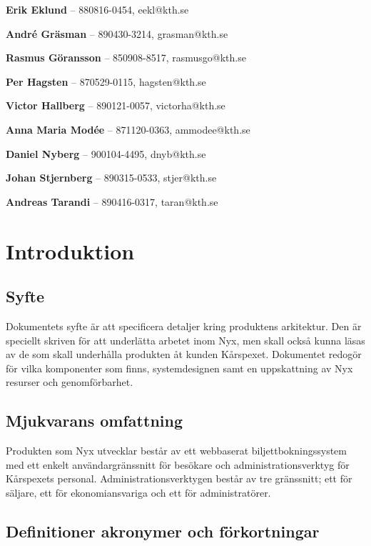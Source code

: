 \documentclass[a4paper, twoside, 11pt, titlepage]{article}
\begin{document}
\textbf{Erik Eklund} -- 880816-0454, eekl@kth.se 

\textbf{André Gräsman} -- 890430-3214, grasman@kth.se 

\textbf{Rasmus Göransson} -- 850908-8517, rasmusgo@kth.se 

\textbf{Per Hagsten} -- 870529-0115, hagsten@kth.se

\textbf{Victor Hallberg} -- 890121-0057, victorha@kth.se

\textbf{Anna Maria Modée} -- 871120-0363, ammodee@kth.se 

\textbf{Daniel Nyberg} -- 900104-4495, dnyb@kth.se 

\textbf{Johan Stjernberg} -- 890315-0533, stjer@kth.se

\textbf{Andreas Tarandi} -- 890416-0317, taran@kth.se

\clearpage \tableofcontents \clearpage

\clearpage
\section{Introduktion}



	\subsection{Syfte}


	Dokumentets syfte är att specificera detaljer kring produktens arkitektur. Den är speciellt skriven för att underlätta arbetet inom Nyx, men skall också kunna läsas av de som skall underhålla produkten åt kunden Kårspexet. Dokumentet redogör för vilka komponenter som finns, systemdesignen samt en uppskattning av Nyx resurser och genomförbarhet.

	\subsection{Mjukvarans omfattning}


	Produkten som Nyx utvecklar består av ett webbaserat biljettbokningssystem med ett enkelt användargränssnitt för besökare och administrationsverktyg för Kårspexets personal. Administrationsverktygen består av tre gränssnitt; ett för säljare, ett för ekonomiansvariga och ett för administratörer.

	\subsection{Definitioner akronymer och förkortningar}
\end{document}

